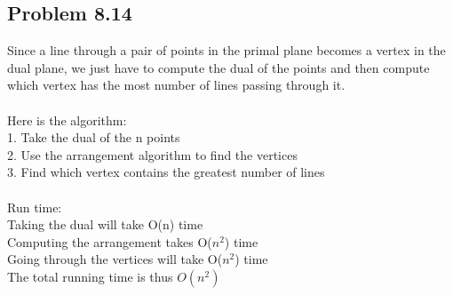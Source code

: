 \documentclass[11pt,psfig]{article}
\begin{document}
\newpage

\subsection*{Problem 8.14}

Since a line through a pair of points in the primal plane becomes a vertex in the dual plane, we just have to compute the dual of the points and then compute which vertex has the most number of lines passing through it. \\
\\
Here is the algorithm:\\
1. Take the dual of the n points\\
2. Use the arrangement algorithm to find the vertices \\
3. Find which vertex contains the greatest number of lines \\
\\
Run time:\\
Taking the dual will take O(n) time \\
Computing the arrangement takes O($n^2$) time \\
Going through the vertices will take O($n^2$) time\\
The total running time is thus $O(n^2)$


\end{document}

